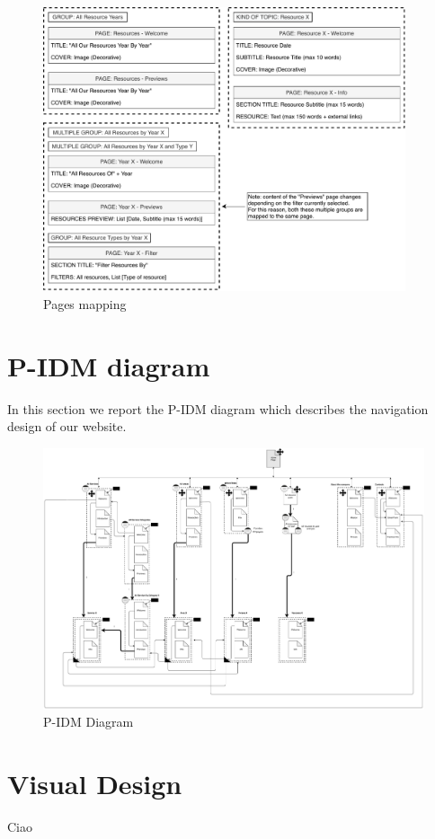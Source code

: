 \documentclass[12pt]{report}
\begin{document}
\begin{figure}[h]
	\centering
	\includegraphics[width=0.95\textwidth]{page_mapping_pt3.pdf}
	\caption{Pages mapping}
\end{figure}

\chapter{P-IDM diagram}
In this section we report the P-IDM diagram which describes the navigation design of our website.\\
\begin{figure}[h]
	\centering
	\includegraphics[width=\textwidth]{P-IDM.pdf}
	\caption{P-IDM Diagram}
\end{figure}

\chapter{Visual Design}
Ciao 
%
\end{document}

